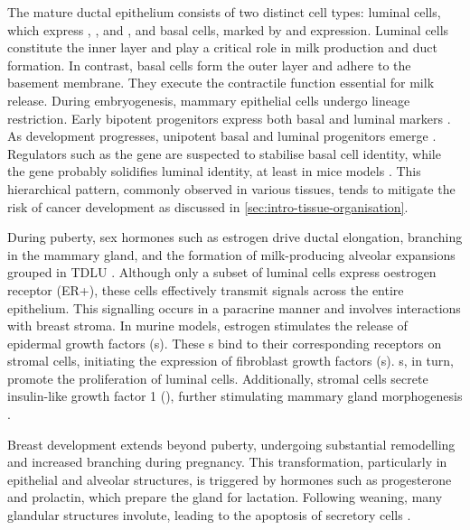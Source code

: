 The mature ductal epithelium consists of two distinct cell types: luminal cells, which express , , and , and basal cells, marked by  and  expression. Luminal cells constitute the inner layer and play a critical role in milk production and duct formation. In contrast, basal cells form the outer layer and adhere to the basement membrane. They execute the contractile function essential for milk release. During embryogenesis, mammary epithelial cells undergo lineage restriction. Early bipotent progenitors express both basal and luminal markers \parencite{Stingl2001-cb,Prater2014-qd,Rios2014-jj}. As development progresses, unipotent basal and luminal progenitors emerge \parencite{Van_Keymeulen2011-um,Rios2014-jj,Tao2014-ol}. Regulators such as the  gene are suspected to stabilise basal cell identity, while the  gene probably solidifies luminal identity, at least in mice models  \parencite{Spina2021-ej}. This hierarchical pattern, commonly observed in various tissues, tends to mitigate the risk of cancer development as discussed in \cref{sec:intro-tissue-organisation}.

During puberty, sex hormones such as estrogen drive ductal elongation, branching in the mammary gland, and the formation of milk-producing alveolar expansions grouped in \acf{TDLU} . Although only a subset of luminal cells express oestrogen receptor (ER+), these cells effectively transmit signals across the entire epithelium. This signalling occurs in a paracrine manner and involves interactions with breast stroma.
In murine models, estrogen stimulates the release of epidermal growth factors (s). These s bind to their corresponding receptors on stromal cells, initiating the expression of fibroblast growth factors (s). s, in turn, promote the proliferation of luminal cells. Additionally, stromal cells secrete insulin-like growth factor 1 (), further stimulating mammary gland morphogenesis \parencite{Macias2012-su}.

Breast development extends beyond puberty, undergoing substantial remodelling and increased branching during pregnancy. This transformation, particularly in epithelial and alveolar structures, is triggered by hormones such as progesterone and prolactin, which prepare the gland for lactation. Following weaning, many glandular structures involute, leading to the apoptosis of secretory cells \parencite{Macias2012-su}.

